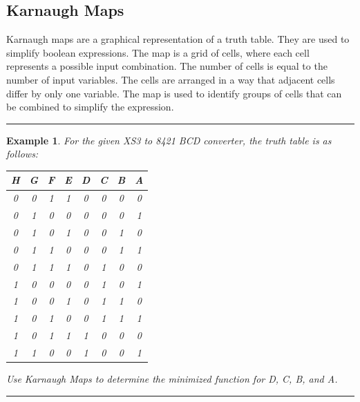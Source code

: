 \documentclass[12pt]{article}
\newtheorem{example}{Example}
\newenvironment{examp}
{
    \vspace{0.5cm}
    \hrule
    \begin{example}\upshape
}
{
    \end{example}
    \hrule
    \vspace{0.5cm}
}
\begin{document}
\subsection{Karnaugh Maps}
Karnaugh maps are a graphical representation of a truth table. They are used to
simplify boolean expressions. The map is a grid of cells, where each cell
represents a possible input combination. The number of cells is equal to the
number of input variables. The cells are arranged in a way that adjacent cells
differ by only one variable. The map is used to identify groups of cells that
can be combined to simplify the expression.
\begin{examp}
For the given XS3 to 8421 BCD converter, the truth table is as follows:

\begin{center}
	\begin{tabular}{|c|c|c|c||c|c|c|c|}
		\hline
		\textbf{H} & \textbf{G} & \textbf{F} & \textbf{E} & \textbf{D} & \textbf{C} & \textbf{B} & \textbf{A} \\
		\hline
		0          & 0          & 1          & 1          & 0          & 0          & 0          & 0          \\
		0          & 1          & 0          & 0          & 0          & 0          & 0          & 1          \\
		0          & 1          & 0          & 1          & 0          & 0          & 1          & 0          \\
		0          & 1          & 1          & 0          & 0          & 0          & 1          & 1          \\
		0          & 1          & 1          & 1          & 0          & 1          & 0          & 0          \\
		1          & 0          & 0          & 0          & 0          & 1          & 0          & 1          \\
		1          & 0          & 0          & 1          & 0          & 1          & 1          & 0          \\
		1          & 0          & 1          & 0          & 0          & 1          & 1          & 1          \\
		1          & 0          & 1          & 1          & 1          & 0          & 0          & 0          \\
		1          & 1          & 0          & 0          & 1          & 0          & 0          & 1          \\
		\hline
	\end{tabular}
\end{center}
Use Karnaugh Maps to determine the minimized function for D, C, B, and A.


\end{examp}
\end{document}
